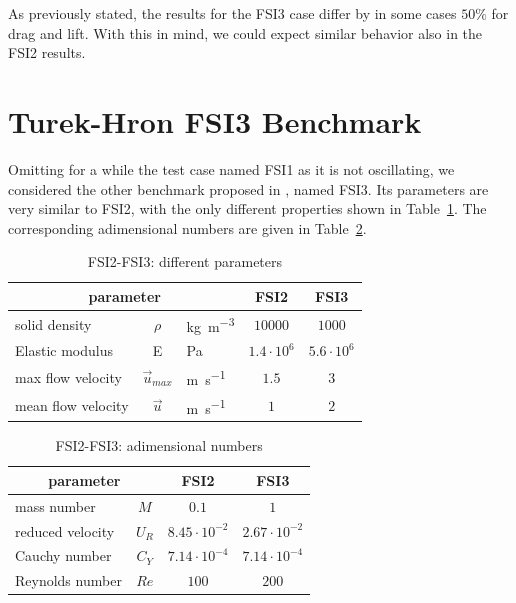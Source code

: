 As previously stated, the results for the FSI3 case differ by in some cases $50\%$ for drag and lift. With this in mind, we could expect similar behavior also in the FSI2 results.


\newpage


\section{Turek-Hron FSI3 Benchmark}
\label{sec:FSI1-FSI3}

Omitting for a while the test case named FSI1 as it is not oscillating, we considered the other benchmark proposed in \cite{turek2006proposal}, named FSI3. Its parameters are very similar to FSI2, with the only different properties shown in Table~\ref{table:FSI3-diff}. The corresponding adimensional numbers are given in Table~\ref{table:FSI3-adim}. 



\begin{table}[!htb]
	\begin{center}
		\begin{tabular}{ l c l | c | c } 
			\multicolumn{3}{c|}{parameter} & FSI2 & FSI3   \\ 
			\hline
			solid density  &  $\rho$ & \si{kg.m^{-3}} & $10000$ & $1000$     \\
			Elastic modulus  & E & \si{Pa} & $1.4\cdot 10^6$ & $5.6\cdot 10^6$   \\
			max flow velocity & $\vec{u}_{max}$ & \si{m.s^{-1}} & $1.5$ & $3$ \\
			mean flow velocity & $\vec{u}$ & \si{m.s^{-1}} & $1$ & $2$  \\
		\end{tabular}
	\end{center}
	\caption{FSI2-FSI3: different parameters}
	\label{table:FSI3-diff}
\end{table}


\begin{table}[!htb]
	\begin{center}
		\begin{tabular}{ l c | c | c} 
			\multicolumn{2}{c|}{parameter} & FSI2 & FSI3   \\ 
			\hline
			mass number  & $M$ & $0.1$ & $1$     \\
			reduced velocity & $U_R$ &  $8.45 \cdot 10^{-2}$  & $2.67\cdot 10^{-2}$  \\
			Cauchy number  & $C_Y$ & \cellcolor{yellow!25}  $7.14\cdot 10^{-4}$  & \cellcolor{yellow!25} $7.14\cdot 10^{-4}$  \\
			Reynolds number & $Re$ & $100$ & $200$ \\	
		\end{tabular}
	\end{center}
	\caption{FSI2-FSI3: adimensional numbers}
	\label{table:FSI3-adim}
\end{table}


